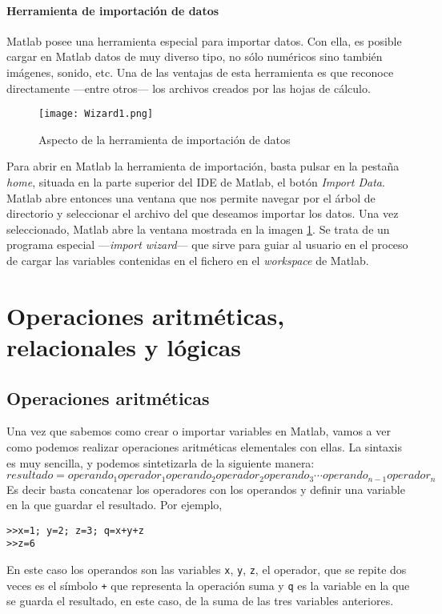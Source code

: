 \paragraph*{Herramienta de importación de datos}
Matlab posee una herramienta especial para importar datos. Con ella, es posible cargar en Matlab datos de muy diverso tipo, no sólo numéricos sino también imágenes, sonido, etc. Una de las ventajas de esta herramienta es que reconoce directamente ---entre otros--- los archivos creados por las hojas de cálculo.
\begin{figure}[h]
	\centering
		\texttt{[image: Wizard1.png]}
	\caption{Aspecto de la herramienta de importación de datos}
	\label{fig:wizard}
\end{figure}

Para abrir en Matlab la herramienta de importación, basta pulsar en la pestaña \emph{home}, situada en la parte superior del IDE de Matlab,   el botón \emph{Import Data}. Matlab abre entonces una ventana que nos permite navegar por el árbol de directorio y seleccionar el archivo del que deseamos importar los datos. Una vez seleccionado, Matlab abre la ventana mostrada en la imagen \ref{fig:wizard}. 
Se trata de un programa especial ---\emph{import wizard}--- que sirve para guiar al usuario en el proceso de cargar las variables contenidas en el fichero en el \emph{workspace} de Matlab.

\section{Operaciones aritméticas, relacionales y lógicas}

\subsection{Operaciones aritméticas}
 Una vez que sabemos como crear o importar variables en Matlab, vamos a ver como podemos realizar operaciones aritméticas elementales con ellas. La sintaxis es muy sencilla, y podemos sintetizarla de la siguiente manera:
\begin{equation*}
resultado=operando_1 operador_1 operando_2 operador_2 operando_3 \cdots operando_{n-1} operador_n
\end{equation*}
Es decir basta concatenar los operadores con los operandos y definir una variable en la que guardar el resultado. Por ejemplo,
\begin{verbatim}
>>x=1; y=2; z=3; q=x+y+z
>>z=6
\end{verbatim}
En este caso los operandos son las variables \texttt{x}, \texttt{y}, \texttt{z}, el operador, que se repite dos veces es el símbolo \texttt{+} que representa la operación suma y \texttt{q} es la variable en la que se guarda el resultado, en este caso, de la suma de las tres variables anteriores.

